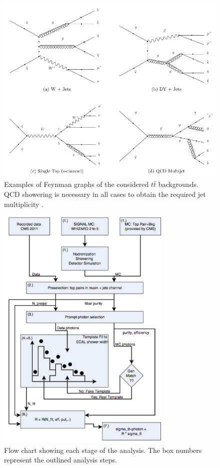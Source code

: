 \begin{figure}
\begin{center}
\includegraphics[width=\textwidth]{Figures/BackgroundDiagrams.png}
\caption{Examples of Feynman graphs of the considered $t\bar{t}$ backgrounds. QCD showering is necessary in all cases to obtain the required jet multiplicity \cite{ttgammabackgroundestimation}.}
\end{center}
\end{figure}

\begin{figure}\label{fig-AnalysisFlowChart}
\begin{center}
\includegraphics[width=0.75\textwidth]{Figures/AnalysisFlowChart.png}
\caption{Flow chart showing each stage of the analysis. The box numbers represent the outlined
analysis steps.}
\end{center}
\end{figure}

